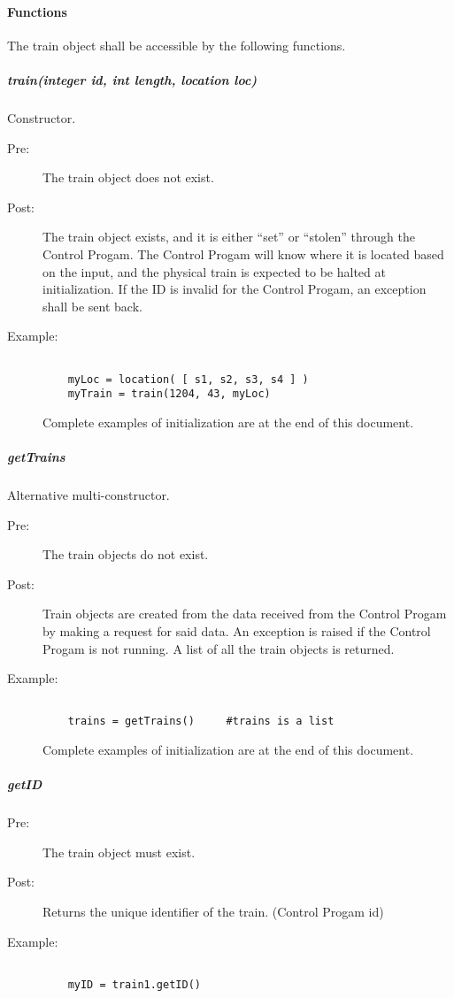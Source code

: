 \documentclass[a4paper,11pt,notitlepage]{article}
\def\CS{Control Progam\xspace}
\begin{document}
\paragraph{Functions}
The train object shall be accessible by the following functions.
\subparagraph{train(integer id, int length, location loc)} Constructor.
\begin{description}
\item[\hspace{1cm}Pre:] The train object does not exist.
\item[\hspace{1cm}Post:] The train object exists, and it is either ``set'' or ``stolen'' through the \CS. The \CS will know where it is located based on the input, and the physical train is expected to be halted at initialization. If the ID is invalid for the \CS, an exception shall be sent back.
\item[\hspace{1cm}Example:]
\begin{verbatim}

	myLoc = location( [ s1, s2, s3, s4 ] )
    myTrain = train(1204, 43, myLoc)
\end{verbatim}
Complete examples of initialization are at the end of this document.
\end{description}

\subparagraph{getTrains} Alternative multi-constructor.
\begin{description}
\item[\hspace{1cm}Pre:] The train objects do not exist.
\item[\hspace{1cm}Post:] Train objects are created from the data received from the \CS by making a request for said data. An exception is raised if the \CS is not running. A list of all the train objects is returned.
\item[\hspace{1cm}Example:]
\begin{verbatim}

    trains = getTrains()     #trains is a list
\end{verbatim}
Complete examples of initialization are at the end of this document.
\end{description}

\subparagraph{getID}
\begin{description}
\item[\hspace{1cm}Pre:] The train object must exist.
\item[\hspace{1cm}Post:] Returns the unique identifier of the train. (\CS id)
\item[\hspace{1cm}Example:]
\begin{verbatim}

    myID = train1.getID()
\end{verbatim}
\end{description}
\end{document}
